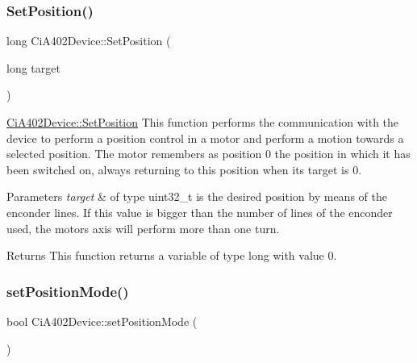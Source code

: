\mbox{\label{classCiA402Device_ae2647017d52b074cb8b4800f77ed65b5}} 
\subsubsection{\texorpdfstring{Set\+Position()}{SetPosition()}}
{\footnotesize\ttfamily long Ci\+A402\+Device\+::\+Set\+Position (\begin{DoxyParamCaption}\item[{long}]{target }\end{DoxyParamCaption})}



\hyperlink{classCiA402Device_ae2647017d52b074cb8b4800f77ed65b5}{Ci\+A402\+Device\+::\+Set\+Position} This function performs the communication with the device to perform a position control in a motor and perform a motion towards a selected position. The motor remembers as position 0 the position in which it has been switched on, always returning to this position when its target is 0. 


\begin{DoxyParams}{Parameters}
{\em target} & of type uint32\+\_\+t is the desired position by means of the enconder lines. If this value is bigger than the number of lines of the enconder used, the motor\textquotesingle{}s axis will perform more than one turn. \\
\hline
\end{DoxyParams}
\begin{DoxyReturn}{Returns}
This function returns a variable of type long with value 0. 
\end{DoxyReturn}
\mbox{\label{classCiA402Device_a8c09be8df402061e170ca297a7ee6cfe}} 
\subsubsection{\texorpdfstring{set\+Position\+Mode()}{setPositionMode()}}
{\footnotesize\ttfamily bool Ci\+A402\+Device\+::set\+Position\+Mode (\begin{DoxyParamCaption}{ }\end{DoxyParamCaption})}

